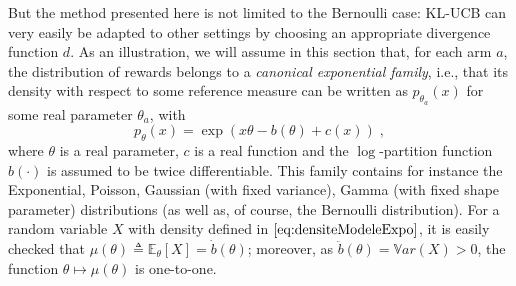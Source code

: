 \documentclass[wcp]{jmlr}
\newcommand{\E}{\mathbb{E}}
\newcommand{\Var}{\mathbb{V}ar}
\newcommand{\1}{\mathbbm{1}}
\begin{document}
But the method presented here is not limited to the Bernoulli case:
 KL-UCB can very easily be adapted to other settings by
choosing an appropriate divergence function $d$.
As an illustration, we will assume in this section that, for each arm $a$, the distribution of rewards belongs to
a \emph{canonical exponential family}, i.e., that its density with respect to some
reference measure can be written as $p_{\theta_a}(x)$ for some real parameter
$\theta_a$, with
\begin{equation}\label{eq:densiteModeleExpo}p_{\theta}(x) = \exp\left( x\theta -
    b(\theta) + c(x) \right)\;,\end{equation}
where $\theta$ is a real parameter, $c$ is a real function and the $\log$-partition function $b(\cdot)$ is assumed to be twice differentiable. This family contains for instance the Exponential, Poisson, Gaussian (with fixed variance), Gamma (with fixed shape parameter) distributions (as well as, of course, the Bernoulli distribution).
For a random variable $X$ with density defined in $\eqref{eq:densiteModeleExpo}$, it is easily checked that $\mu(\theta)\triangleq \E_\theta[X] =\dot{b}(\theta)$; moreover, as $\ddot{b}(\theta)=\Var(X)>0$, the function $\theta\mapsto \mu(\theta)$ is one-to-one.
\end{document}
